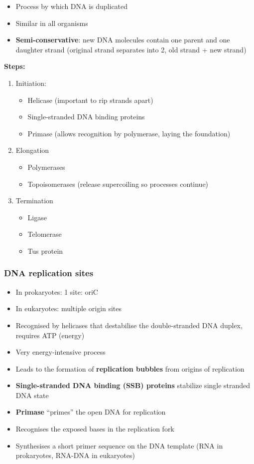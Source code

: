 \documentclass[letterpaper, 12pt]{article}
\begin{document}
\begin{itemize}
\item Process by which DNA is duplicated
\item Similar in all organisms
\item \textbf{Semi-conservative}: new DNA molecules contain one parent and one daughter strand (original strand separates into 2, old strand + new strand)
\end{itemize}

\textbf{Steps:}

\begin{enumerate}
\item Initiation:
\begin{itemize}
\item Helicase (important to rip strands apart)
\item Single-stranded DNA binding proteins
\item Primase (allows recognition by polymerase, laying the foundation)
\end{itemize}
\item Elongation
\begin{itemize}
\item Polymerases
\item Topoisomerases (release supercoiling so processes continue)
\end{itemize}
\item Termination
\begin{itemize}
\item Ligase
\item Telomerase
\item Tus protein
\end{itemize}
\end{enumerate}

\subsubsection*{DNA replication sites}
\begin{itemize}
\item In prokaryotes: 1 site: oriC
\item In eukaryotes: multiple origin sites
\item Recognised by helicases that destabilise the double-stranded DNA duplex, requires ATP (energy)
\item Very energy-intensive process
\item Leads to the formation of \textbf{replication bubbles} from origins of replication
\item \textbf{Single-stranded DNA binding (SSB) proteins} stabilize single stranded DNA state
\item \textbf{Primase} ``primes'' the open DNA for replication
\item Recognises the exposed bases in the replication fork
\item Synthesises a short primer sequence on the DNA template (RNA in prokaryotes, RNA-DNA in eukaryotes)
\end{itemize}
\end{document}
